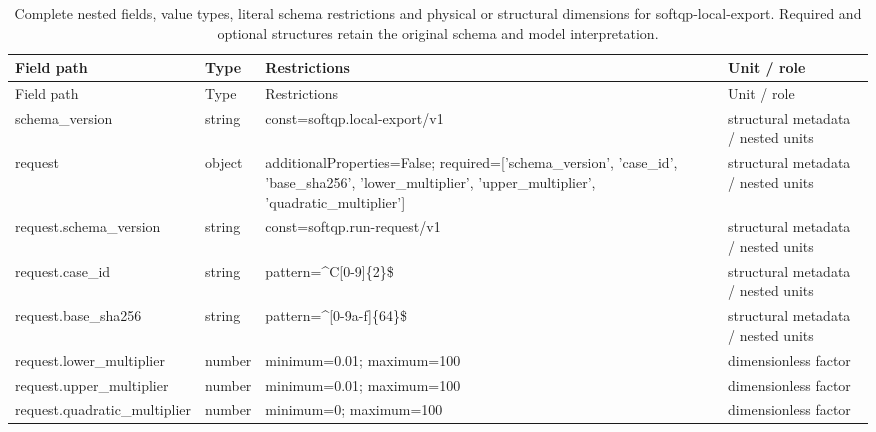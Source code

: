 \begingroup\footnotesize\setlength{\tabcolsep}{3pt}
\begin{longtable}{@{}>{\raggedright\arraybackslash}p{}>{\raggedright\arraybackslash}p{}>{\raggedright\arraybackslash}p{}>{\raggedright\arraybackslash}p{}@{}}
\caption{Complete nested fields, value types, literal schema restrictions and physical or structural dimensions for softqp-local-export. Required and optional structures retain the original schema and model interpretation.}\label{tab:nested-softqp-local-export}\\
\toprule Field path & Type & Restrictions & Unit / role\\\midrule\endfirsthead
\toprule Field path & Type & Restrictions & Unit / role\\\midrule\endhead
\bottomrule\endfoot
schema\_\allowbreak{}version & string & const=\allowbreak{}softqp.\allowbreak{}local-\allowbreak{}export/\allowbreak{}v1 & structural metadata /\allowbreak{} nested units\\
request & object & additionalProperties=\allowbreak{}False; required=\allowbreak{}['schema\_\allowbreak{}version', 'case\_\allowbreak{}id', 'base\_\allowbreak{}sha256', 'lower\_\allowbreak{}multiplier', 'upper\_\allowbreak{}multiplier', 'quadratic\_\allowbreak{}multiplier'] & structural metadata /\allowbreak{} nested units\\
request.\allowbreak{}schema\_\allowbreak{}version & string & const=\allowbreak{}softqp.\allowbreak{}run-\allowbreak{}request/\allowbreak{}v1 & structural metadata /\allowbreak{} nested units\\
request.\allowbreak{}case\_\allowbreak{}id & string & pattern=\allowbreak{}\textasciicircum{}C[0-9]\{2\}\$ & structural metadata /\allowbreak{} nested units\\
request.\allowbreak{}base\_\allowbreak{}sha256 & string & pattern=\allowbreak{}\textasciicircum{}[0-9a-\allowbreak{}f]\{64\}\$ & structural metadata /\allowbreak{} nested units\\
request.\allowbreak{}lower\_\allowbreak{}multiplier & number & minimum=\allowbreak{}0.\allowbreak{}01; maximum=\allowbreak{}100 & dimensionless factor\\
request.\allowbreak{}upper\_\allowbreak{}multiplier & number & minimum=\allowbreak{}0.\allowbreak{}01; maximum=\allowbreak{}100 & dimensionless factor\\
request.\allowbreak{}quadratic\_\allowbreak{}multiplier & number & minimum=\allowbreak{}0; maximum=\allowbreak{}100 & dimensionless factor\\

\end{longtable}

